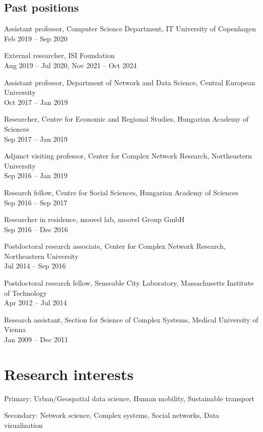 \documentclass[10pt,a4paper]{article}
\renewenvironment{itemize}{
  \begin{list}{}{
    \setlength{\leftmargin}{1.5em}
    \setlength{\itemsep}{0.25em}
    \setlength{\parskip}{0pt}
    \setlength{\parsep}{0.25em}
  }
}{
  \end{list}
}
\begin{document}
\subsection*{Past positions}
\begin{itemize}
\item Assistant professor, Computer Science Department, IT University of Copenhagen\\Feb 2019 -- Sep 2020
\item External researcher, ISI Foundation\\Aug 2019 -- Jul 2020, Nov 2021 -- Oct 2024
\item Assistant professor, Department of Network and Data Science, Central European University\\Oct 2017 -- Jan 2019
\item Researcher, Centre for Economic and Regional Studies, Hungarian Academy of Sciences\\Sep 2017 -- Jan 2019
\item Adjunct visiting professor, Center for Complex Network Research, Northeastern University\\Sep 2016 -- Jan 2019
\item Research fellow, Centre for Social Sciences, Hungarian Academy of Sciences\\Sep 2016 -- Sep 2017
\item Researcher in residence, moovel lab, moovel Group GmbH\\Sep 2016 -- Dec 2016
\item Postdoctoral research associate, Center for Complex Network Research, Northeastern University\\Jul 2014 -- Sep 2016
\item Postdoctoral research fellow, Senseable City Laboratory, Massachusetts Institute of Technology\\Apr 2012 -- Jul 2014
\item Research assistant, Section for Science of Complex Systems, Medical University of Vienna\\Jan 2009 -- Dec 2011
\end{itemize}

\section*{Research interests}
\begin{itemize}
\item Primary: Urban/Geospatial data science, Human mobility, Sustainable transport
\item Secondary: Network science, Complex systems, Social networks, Data visualization
\end{itemize}
\end{document}
